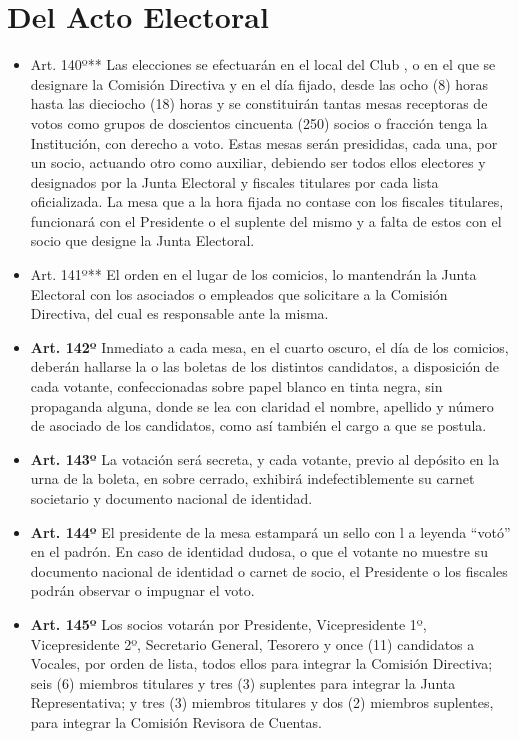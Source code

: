 \documentclass[]{book}
\begin{document}
\section{Del Acto Electoral}\label{del-acto-electoral}

\begin{itemize}
\item
  Art. 140º** Las elecciones se efectuarán en el local del Club , o en
  el que se designare la Comisión Directiva y en el día fijado, desde
  las ocho (8) horas hasta las dieciocho (18) horas y se constituirán
  tantas mesas receptoras de votos como grupos de doscientos cincuenta
  (250) socios o fracción tenga la Institución, con derecho a voto.
  Estas mesas serán presididas, cada una, por un socio, actuando otro
  como auxiliar, debiendo ser todos ellos electores y designados por la
  Junta Electoral y fiscales titulares por cada lista oficializada. La
  mesa que a la hora fijada no contase con los fiscales titulares,
  funcionará con el Presidente o el suplente del mismo y a falta de
  estos con el socio que designe la Junta Electoral.
\item
  Art. 141º** El orden en el lugar de los comicios, lo mantendrán la
  Junta Electoral con los asociados o empleados que solicitare a la
  Comisión Directiva, del cual es responsable ante la misma.
\item
  \textbf{Art. 142º} Inmediato a cada mesa, en el cuarto oscuro, el día
  de los comicios, deberán hallarse la o las boletas de los distintos
  candidatos, a disposición de cada votante, confeccionadas sobre papel
  blanco en tinta negra, sin propaganda alguna, donde se lea con
  claridad el nombre, apellido y número de asociado de los candidatos,
  como así también el cargo a que se postula.
\item
  \textbf{Art. 143º} La votación será secreta, y cada votante, previo al
  depósito en la urna de la boleta, en sobre cerrado, exhibirá
  indefectiblemente su carnet societario y documento nacional de
  identidad.
\item
  \textbf{Art. 144º} El presidente de la mesa estampará un sello con l a
  leyenda ``votó'' en el padrón. En caso de identidad dudosa, o que el
  votante no muestre su documento nacional de identidad o carnet de
  socio, el Presidente o los fiscales podrán observar o impugnar el
  voto.
\item
  \textbf{Art. 145º} Los socios votarán por Presidente, Vicepresidente
  1º, Vicepresidente 2º, Secretario General, Tesorero y once (11)
  candidatos a Vocales, por orden de lista, todos ellos para integrar la
  Comisión Directiva; seis (6) miembros titulares y tres (3) suplentes
  para integrar la Junta Representativa; y tres (3) miembros titulares y
  dos (2) miembros suplentes, para integrar la Comisión Revisora de
  Cuentas.
\end{itemize}
\end{document}
